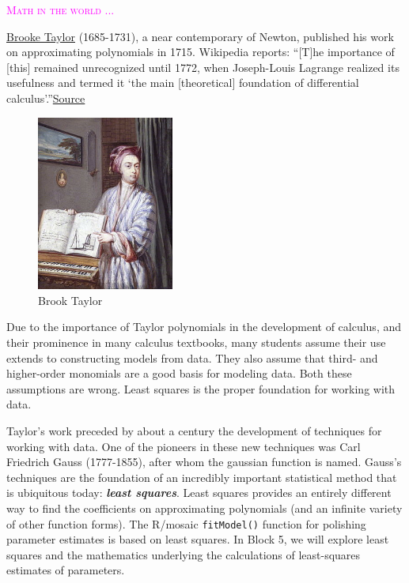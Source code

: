 \documentclass[
  letterpaper,
  DIV=11,
  numbers=noendperiod,
  oneside]{scrreprt}
\newenvironment{intheworld}%
{%
\textcolor{magenta}{\hrulefill}%
  \par\vspace{.3\baselineskip}%
  \textcolor{magenta}{\scshape Math in the world ...}%
  \par\vspace{\baselineskip}%
}%
{\textcolor{magenta}{\hrulefill}}
\begin{document}
\begin{intheworld}
\href{https://en.wikipedia.org/wiki/Brook_Taylor}{Brooke Taylor}
(1685-1731), a near contemporary of Newton, published his work on
approximating polynomials in 1715. Wikipedia reports: ``{[}T{]}he
importance of {[}this{]} remained unrecognized until 1772, when
Joseph-Louis Lagrange realized its usefulness and termed it `the main
{[}theoretical{]} foundation of differential
calculus'.''\href{https://en.wikipedia.org/wiki/Brook_Taylor\#/media/File:Taylor_Brook_Goupy_NPG.jpg}{Source}

\begin{figure}

{\centering \includegraphics[width=0.4\textwidth,height=\textheight]{Differentiation/www/Brook_Taylor.jpg}

}

\caption{\label{fig-brook-taylor}Brook Taylor}

\end{figure}

Due to the importance of Taylor polynomials in the development of
calculus, and their prominence in many calculus textbooks, many students
assume their use extends to constructing models from data. They also
assume that third- and higher-order monomials are a good basis for
modeling data. Both these assumptions are wrong. Least squares is the
proper foundation for working with data.

Taylor's work preceded by about a century the development of techniques
for working with data. One of the pioneers in these new techniques was
Carl Friedrich Gauss (1777-1855), after whom the gaussian function is
named. Gauss's techniques are the foundation of an incredibly important
statistical method that is ubiquitous today: \textbf{\emph{least
squares}}. Least squares provides an entirely different way to find the
coefficients on approximating polynomials (and an infinite variety of
other function forms). The R/mosaic \texttt{fitModel()} function for
polishing parameter estimates is based on least squares. In Block 5, we
will explore least squares and the mathematics underlying the
calculations of least-squares estimates of parameters.

\end{intheworld}
\end{document}
